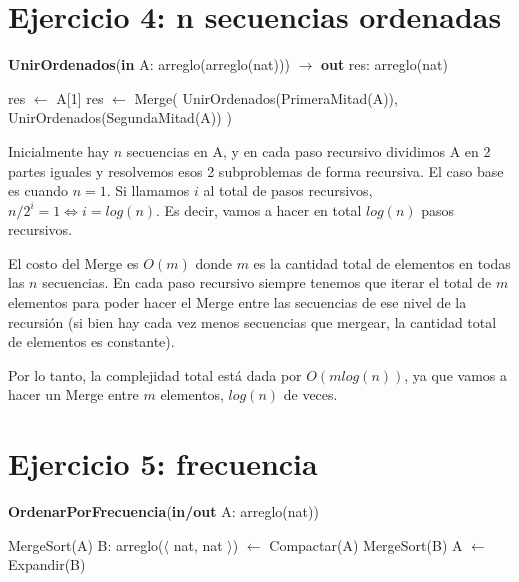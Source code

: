 \section{Ejercicio 4: n secuencias ordenadas}

\begin{algorithm}[H]
\caption{
    \textbf{UnirOrdenados}(\textbf{in} A: arreglo(arreglo(nat))) $\to$ \textbf{out} res: arreglo(nat)
}
\begin{algorithmic}[1]
        \State res $\gets$ A[1]
    \Else
        \State res $\gets$ Merge(
        \State \;\; UnirOrdenados(PrimeraMitad(A)),
        \State \;\; UnirOrdenados(SegundaMitad(A))
        \State )
    \EndIf
\end{algorithmic}
\end{algorithm}

Inicialmente hay $n$ secuencias en A, y en cada paso recursivo dividimos A en 2 partes iguales y resolvemos esos 2 subproblemas de forma recursiva. El caso base es cuando $n = 1$. Si llamamos $i$ al total de pasos recursivos, $n / 2^i = 1 \iff i = log(n)$. Es decir, vamos a hacer en total $log(n)$ pasos recursivos.

El costo del Merge es $O(m)$ donde $m$ es la cantidad total de elementos en todas las $n$ secuencias. En cada paso recursivo siempre tenemos que iterar el total de $m$ elementos para poder hacer el Merge entre las secuencias de ese nivel de la recursión (si bien hay cada vez menos secuencias que mergear, la cantidad total de elementos es constante).

Por lo tanto, la complejidad total está dada por $O(m log(n))$, ya que vamos a hacer un Merge entre $m$ elementos, $log(n)$ de veces.

\section{Ejercicio 5: frecuencia}

\begin{algorithm}[H]
\caption{
    \textbf{OrdenarPorFrecuencia}(\textbf{in/out} A: arreglo(nat))
}
\begin{algorithmic}[1]
    \State MergeSort(A) 
    \State B: arreglo($\langle$ nat, nat $\rangle$) $\gets$ Compactar(A) 
    \State MergeSort(B) 
    \State A $\gets$ Expandir(B) 
\end{algorithmic}
\end{algorithm}

